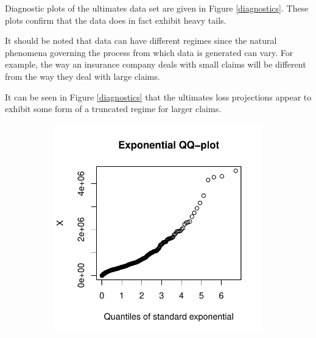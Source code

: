 Diagnostic plots of the ultimates data set are given in Figure \ref{diagnostics}. These plots confirm that the data does in fact exhibit heavy tails.

It should be noted that data can have different regimes since the natural phenomena governing the process from which data is generated can vary. For example, the way an insurance company deals with small claims will be different from the way they deal with large claims. 

It can be seen in Figure \ref{diagnostics} that the ultimates loss projections appear to exhibit some form of a truncated regime for larger claims.

\begin{figure}[hh!]
	\begin{subfigure}[t]{0.45\textwidth}
		\includegraphics[width=\textwidth]{./plots/ExponentialQQ.pdf}
	\end{subfigure}
	\hfill
	\begin{subfigure}[t]{0.45\textwidth}

\end{subfigure}
\end{figure}

